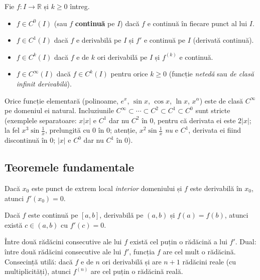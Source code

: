 \begin{definitie}
Fie $f:I\to\mathbb{R}$ și $k\ge0$ întreg.
\begin{itemize}[leftmargin=*, itemsep=1pt]
\item $f\in C^0(I)$ (sau $f$ \textbf{continuă} pe $I$) dacă $f$ e continuă în fiecare punct al lui $I$.
\item $f\in C^1(I)$ dacă $f$ e derivabilă pe $I$ și $f'$ e continuă pe $I$ (derivată continuă).
\item $f\in C^k(I)$ dacă $f$ e de $k$ ori derivabilă pe $I$ și $f^{(k)}$ e continuă.
\item $f\in C^\infty(I)$ dacă $f\in C^k(I)$ pentru orice $k\ge0$ (funcție \emph{netedă} sau \emph{de clasă infinit derivabilă}).
\end{itemize}
Orice funcție elementară (polinoame, $e^x$, $\sin x$, $\cos x$, $\ln x$, $x^\alpha$) este de clasă $C^\infty$ pe domeniul ei natural. Incluziunile $C^\infty\subset\cdots\subset C^2\subset C^1\subset C^0$ sunt stricte (exemplele separatoare: $x|x|$ e $C^1$ dar nu $C^2$ în $0$, pentru că derivata ei este $2|x|$; la fel $x^3\sin\frac1x$, prelungită cu $0$ în $0$; atenție, $x^2\sin\frac1x$ \emph{nu} e $C^1$, derivata ei fiind discontinuă în $0$; $|x|$ e $C^0$ dar nu $C^1$ în $0$).
\end{definitie}

\subsection{Teoremele fundamentale}

\begin{teorema}[Fermat]
Dacă $x_0$ este punct de extrem local \emph{interior} domeniului și $f$ este derivabilă în $x_0$, atunci $f'(x_0)=0$.
\end{teorema}

\begin{teorema}[Rolle]
Dacă $f$ este continuă pe $[a,b]$, derivabilă pe $(a,b)$ și $f(a)=f(b)$, atunci există $c\in(a,b)$ cu $f'(c)=0$.
\end{teorema}

\begin{corolar}
Între două rădăcini consecutive ale lui $f$ există cel puțin o rădăcină a lui $f'$. Dual: între două rădăcini consecutive ale lui $f'$, funcția $f$ are cel mult o rădăcină. Consecință utilă: dacă $f$ e de $n$ ori derivabilă și are $n+1$ rădăcini reale (cu multiplicități), atunci $f^{(n)}$ are cel puțin o rădăcină reală.
\end{corolar}

